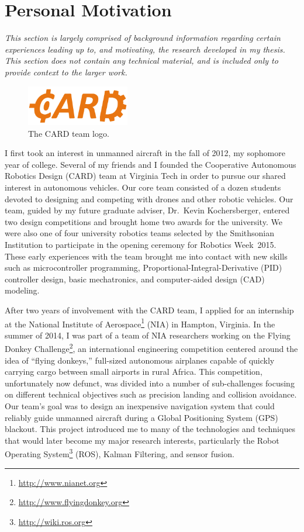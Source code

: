 \section{Personal Motivation}

\textit{This section is largely comprised of background information regarding certain experiences leading up to, and motivating, the research developed in my thesis. This section does not contain any technical material, and is included only to provide context to the larger work.}

\vspace{1em}

\begin{figure}
  \centering
    \includegraphics[width=0.4\textwidth]{CARD_gearREALLYBIG}
  \caption[CARD Team Logo]{The CARD team logo.}
  \label{fig:card_logo}
\end{figure}

I first took an interest in unmanned aircraft in the fall of 2012, my sophomore year of college. Several of my friends and I founded the Cooperative Autonomous Robotics Design (CARD) team at Virginia Tech in order to pursue our shared interest in autonomous vehicles. Our core team consisted of a dozen students devoted to designing and competing with drones and other robotic vehicles. Our team, guided by my future graduate adviser, Dr.~Kevin Kochersberger, entered two design competitions and brought home two awards for the university. We were also one of four university robotics teams selected by the Smithsonian Institution to participate in the opening ceremony for Robotics Week~2015. These early experiences with the team brought me into contact with new skills such as microcontroller programming, Proportional-Integral-Derivative (PID) controller design, basic mechatronics, and computer-aided design (CAD) modeling.

After two years of involvement with the CARD team, I applied for an internship at the National Institute of Aerospace\footnote{\url{http://www.nianet.org}} (NIA) in Hampton, Virginia. In the summer of 2014, I was part of a team of NIA researchers working on the Flying Donkey Challenge\footnote{\url{http://www.flyingdonkey.org}}, an international engineering competition centered around the idea of ``flying donkeys,'' full-sized autonomous airplanes capable of quickly carrying cargo between small airports in rural Africa. This competition, unfortunately now defunct, was divided into a number of sub-challenges focusing on different technical objectives such as precision landing and collision avoidance. Our team's goal was to design an inexpensive navigation system that could reliably guide unmanned aircraft during a Global Positioning System (GPS) blackout. This project introduced me to many of the technologies and techniques that would later become my major research interests, particularly the Robot Operating System\footnote{\url{http://wiki.ros.org}} (ROS), Kalman Filtering, and sensor fusion.

